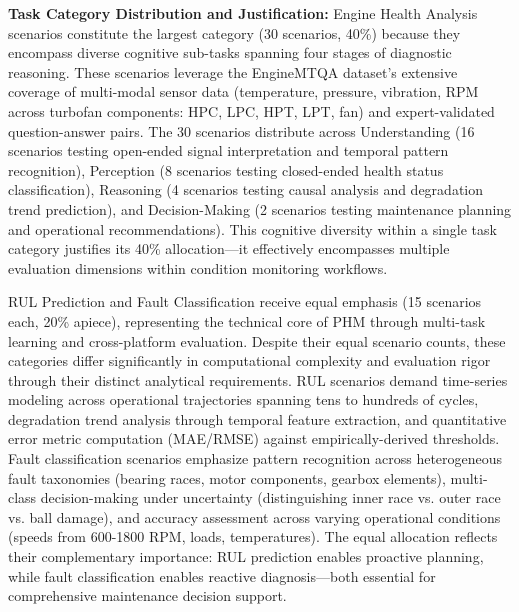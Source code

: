 \documentclass[sigconf,review]{acmart}
\begin{document}
\textbf{Task Category Distribution and Justification:} Engine Health Analysis scenarios constitute the largest category (30 scenarios, 40\%) because they encompass diverse cognitive sub-tasks spanning four stages of diagnostic reasoning. These scenarios leverage the EngineMTQA dataset's extensive coverage of multi-modal sensor data (temperature, pressure, vibration, RPM across turbofan components: HPC, LPC, HPT, LPT, fan) and expert-validated question-answer pairs. The 30 scenarios distribute across Understanding (16 scenarios testing open-ended signal interpretation and temporal pattern recognition), Perception (8 scenarios testing closed-ended health status classification), Reasoning (4 scenarios testing causal analysis and degradation trend prediction), and Decision-Making (2 scenarios testing maintenance planning and operational recommendations). This cognitive diversity within a single task category justifies its 40\% allocation---it effectively encompasses multiple evaluation dimensions within condition monitoring workflows.

RUL Prediction and Fault Classification receive equal emphasis (15 scenarios each, 20\% apiece), representing the technical core of PHM through multi-task learning and cross-platform evaluation. Despite their equal scenario counts, these categories differ significantly in computational complexity and evaluation rigor through their distinct analytical requirements. RUL scenarios demand time-series modeling across operational trajectories spanning tens to hundreds of cycles, degradation trend analysis through temporal feature extraction, and quantitative error metric computation (MAE/RMSE) against empirically-derived thresholds. Fault classification scenarios emphasize pattern recognition across heterogeneous fault taxonomies (bearing races, motor components, gearbox elements), multi-class decision-making under uncertainty (distinguishing inner race vs. outer race vs. ball damage), and accuracy assessment across varying operational conditions (speeds from 600-1800 RPM, loads, temperatures). The equal allocation reflects their complementary importance: RUL prediction enables proactive planning, while fault classification enables reactive diagnosis—both essential for comprehensive maintenance decision support.
\end{document}
